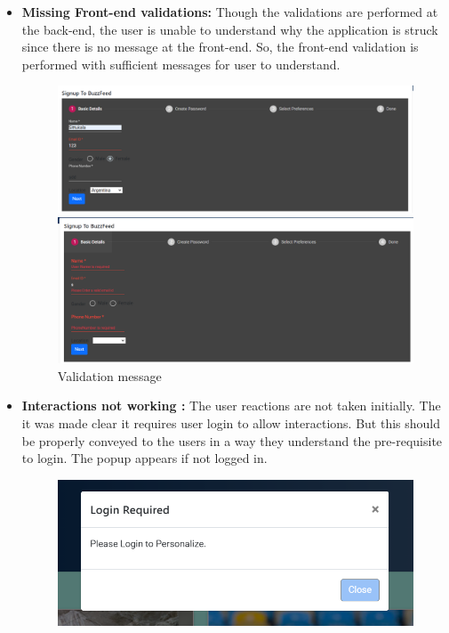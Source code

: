  \begin{itemize}
     \item\textbf{ Missing Front-end validations:} 
     Though the validations are performed at the back-end, the user is unable to understand why the application is struck since there is no message at the front-end. So, the front-end validation is performed with sufficient messages for user to understand.
   \begin{figure}[h!]
    \begin{multicols}{2}
    \includegraphics[width=\linewidth]{images/novalidation.PNG}\par 
    \includegraphics[width=\linewidth]{images/validation.PNG}\par 
    \end{multicols}
\centering \caption{Validation message}
\end{figure}

 \item\textbf{Interactions not working : } 
 The user reactions are not taken initially. The it was made clear it requires user login to allow interactions. But this should be properly conveyed to the users in a way they understand the pre-requisite to login. The popup appears if not logged in.
 
  \begin{figure}[h!]
    
    \includegraphics[width=\linewidth]{images/loginrequire.PNG}\par 
  

\end{figure}
\end{itemize}
